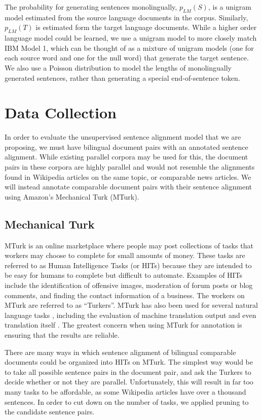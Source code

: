 \documentclass[11pt,letterpaper]{article}
\begin{document}
The probability for generating sentences monolingually, $p_{LM}(S)$, is a
unigram model estimated from the source language documents in the corpus.
Similarly, $p_{LM}(T)$ is estimated form the target language documents. While a
higher order language model could be learned, we use a unigram model to more
closely match IBM Model 1, which can be thought of as a mixture of unigram
models (one for each source word and one for the null word) that generate the
target sentence. We also use a Poisson distribution to model the lengths of 
monolingually generated sentences, rather than generating a special
end-of-sentence token.

\section{Data Collection}
\label{sec:data}
In order to evaluate the unsupervised sentence alignment model that we are
proposing, we must have bilingual document pairs with an annotated sentence
alignment. While existing parallel corpora may be used for this, the document
pairs in these corpora are highly parallel and would not resemble the alignments
found in Wikipedia articles on the same topic, or comparable news articles. We
will instead annotate comparable document pairs with their sentence alignment
using Amazon's Mechanical Turk (MTurk). 

\subsection{Mechanical Turk}

MTurk is an online marketplace where people may post collections of tasks
that workers may choose to complete for small amounts of money. These tasks are
referred to as Human Intelligence Tasks (or HITs) because they are intended to
be easy for humans to complete but difficult to automate. Examples of HITs
include the identification of offensive images, moderation of forum posts or
blog comments, and finding the contact information of a business. The workers on
MTurk are referred to as ``Turkers''.
MTurk has also been used for several natural language tasks \cite{Snow08},
including the evaluation of machine translation output \cite{Callison-Burch09}
and even translation itself \cite{Zaidan11}. The greatest concern when using
MTurk for annotation is ensuring that the results are reliable.

There are many ways in which sentence alignment of bilingual comparable
documents could be organized into HITs on MTurk. The simplest way would be to
take all possible sentence pairs in the document pair, and ask the Turkers to decide
whether or not they are parallel. Unfortunately, this will result in far too
many tasks to be affordable, as some Wikipedia articles have over a thousand
sentences. In order to cut down on the number of tasks, we applied pruning to
the candidate sentence pairs.
\end{document}
